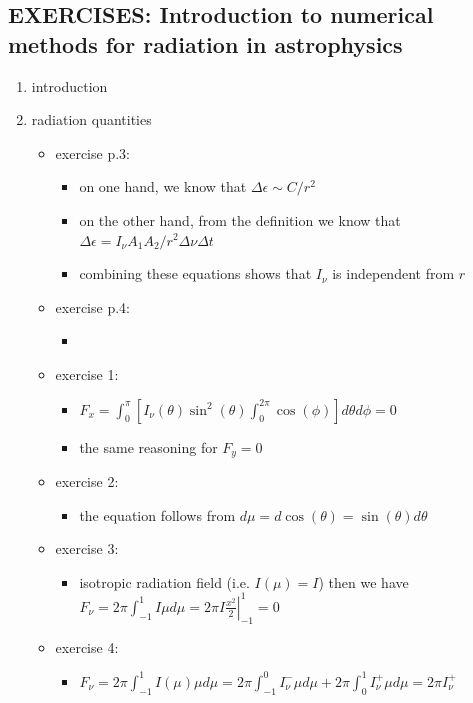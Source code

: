 \documentclass[../main/main.tex]{subfiles}
\begin{document}
\subsection{EXERCISES: Introduction to numerical methods for radiation in astrophysics}
\begin{enumerate}
\item introduction
\item radiation quantities
\begin{itemize}

\item exercise p.3: 
\begin{itemize}
\item on one hand, we know that $\Delta \epsilon \sim C/r^2 $
\item on the other hand, from the definition we know  that $\Delta \epsilon = I_{\nu} A_1 A_2/r^2 \Delta \nu \Delta t$
\item combining these equations shows that $I_{\nu}$ is independent from $r$
\end{itemize}

\item exercise p.4:
\begin{itemize}
\item 
\end{itemize}

\item exercise 1:
\begin{itemize}
\item $F_x =  \int_0^{\pi} \left[ I_{\nu}(\theta)\sin^2(\theta) \int_0^{2 \pi}\cos(\phi) \right] d\theta d \phi = 0 $
\item the same reasoning for $F_y = 0$
\end{itemize}

\item exercise 2:
\begin{itemize}
\item the equation follows from $d\mu = d\cos(\theta) = \sin(\theta) d\theta$
\end{itemize}

\item exercise 3: 
\begin{itemize}
\item isotropic radiation field (i.e. $I(\mu) = I$) then we have $F_{\nu} = 2 \pi  \int_{-1}^{1} I \mu d\mu = 2 \pi I \left. \frac{x^2}{2}\right \rvert_
{-1}^{1} = 0$
\end{itemize}

\item exercise 4:
\begin{itemize}
\item $F_{\nu} = 2 \pi  \int_{-1}^{1} I(\mu) \mu d\mu 
	= 2 \pi  \int_{-1}^{0} I_{\nu}^{-} \mu d\mu 
	+ 2 \pi  \int_{0}^{1} I_{\nu}^{+} \mu d\mu 
	= 2 \pi I_{\nu}^+ $
\end{itemize}


\end{itemize}
\end{enumerate}
\end{document}
